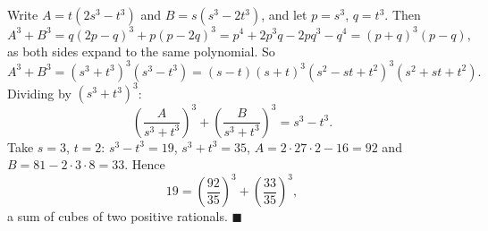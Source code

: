 Write $A=t\left(2s^3-t^3\right)$ and $B=s\left(s^3-2t^3\right)$, and let $p=s^3$, $q=t^3$. Then
\[A^3+B^3=q(2p-q)^3+p(p-2q)^3=p^4+2p^3q-2pq^3-q^4=(p+q)^3(p-q),\]
as both sides expand to the same polynomial. So
\[A^3+B^3=\left(s^3+t^3\right)^3\left(s^3-t^3\right)=(s-t)(s+t)^3\left(s^2-st+t^2\right)^3\left(s^2+st+t^2\right).\]
Dividing by $\left(s^3+t^3\right)^3$:
\[\left(\dfrac{A}{s^3+t^3}\right)^3+\left(\dfrac{B}{s^3+t^3}\right)^3=s^3-t^3.\]
Take $s=3$, $t=2$: $s^3-t^3=19$, $s^3+t^3=35$, $A=2\cdot27\cdot2-16=92$ and $B=81-2\cdot3\cdot8=33$. Hence
\[19=\left(\dfrac{92}{35}\right)^3+\left(\dfrac{33}{35}\right)^3,\]
a sum of cubes of two positive rationals. $\blacksquare$
